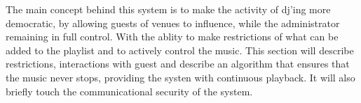 The main concept behind this system is to make the activity of dj'ing more democratic, by allowing guests of venues to influence, while the administrator remaining in full control. With the ablity to make restrictions of what can be added to the playlist and to actively control the music. This section will describe restrictions, interactions with guest and describe an algorithm that ensures that the music never stops, providing the systen with continuous playback. It will also briefly touch the communicational security of the system.
